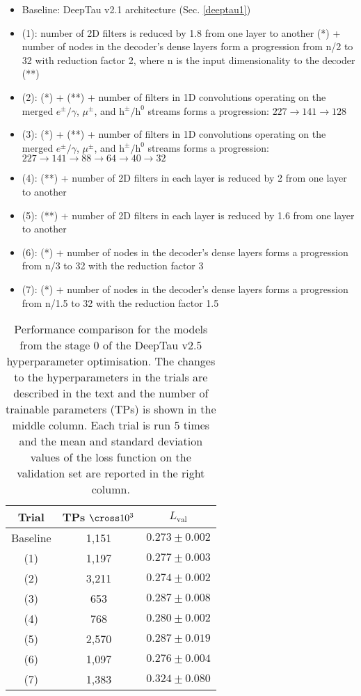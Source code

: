 \begin{itemize}
    \item Baseline: DeepTau v2.1 architecture (Sec. \ref{deeptau1})
    \item (1): number of 2D filters is reduced by 1.8 from one layer to another (*) + number of nodes in the decoder's dense layers form a progression from n/2 to 32 with reduction factor 2, where n is the input dimensionality to the decoder (**) 
    \item (2): (*) + (**) + number of filters in 1D convolutions operating on the merged $e^\pm/\gamma$, $\mu^\pm$, and $\mathrm{h}^\pm/\mathrm{h}^0$ streams forms a progression: $227 \to 141 \to 128$
    \item (3): (*) + (**) + number of filters in 1D convolutions operating on the merged $e^\pm/\gamma$, $\mu^\pm$, and $\mathrm{h}^\pm/\mathrm{h}^0$ streams forms a progression: $227 \to 141 \to 88 \to 64 \to 40 \to 32$
    \item (4): (**) + number of 2D filters in each layer is reduced by 2 from one layer to another
    \item (5): (**) + number of 2D filters in each layer is reduced by 1.6 from one layer to another
    \item (6): (*) + number of nodes in the decoder's dense layers forms a progression from n/3 to 32 with the reduction factor 3 
    \item (7): (*) + number of nodes in the decoder's dense layers forms a progression from n/1.5 to 32 with the reduction factor 1.5 
\end{itemize} 
\begin{table}[h]
	\caption{Performance comparison for the models from the stage 0 of the DeepTau v2.5 hyperparameter optimisation. The changes to the hyperparameters in the trials are described in the text and the number of trainable parameters (TPs) is shown in the middle column. Each trial is run 5 times and the mean and standard deviation values of the loss function on the validation set are reported in the right column.}
    \centering
	\begin{tabular}{c|c|c}
		Trial & TPs $\cross 10^{3}$  & $L_\text{val}$\\
		\hline
		Baseline & 1,151 & $\mathbf{0.273 \pm 0.002}$\\
        (1) & 1,197  & $0.277 \pm 0.003$\\
        (2)  & 3,211 & $0.274 \pm 0.002$ \\
        (3)  & 653 & $0.287	\pm 0.008$ \\
        (4)  & 768 & $0.280 \pm 0.002$ \\
        (5)  & 2,570 & $0.287 \pm 0.019$ \\ 
        (6)  & 1,097 & $0.276 \pm 0.004$ \\
        (7)  & 1,383 & $0.324 \pm 0.080$ \\
	\end{tabular} \label{tab:v2p5_stage0}
\end{table}

